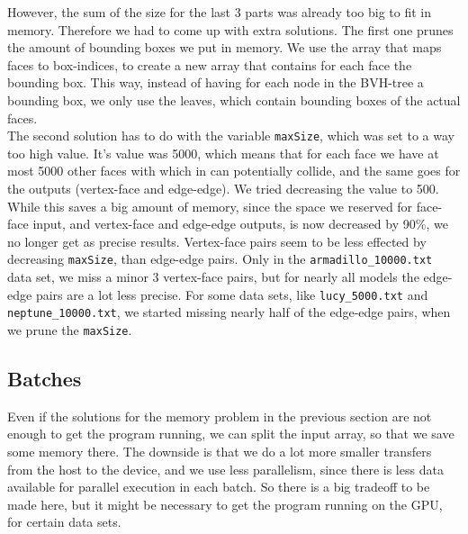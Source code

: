 However, the sum of the size for the last 3 parts was already too big to fit in memory. Therefore we had to come up with extra solutions. The first one prunes the amount of bounding boxes we put in memory. We use the array that maps faces to box-indices, to create a new array that contains for each face the bounding box. This way, instead of having for each node in the BVH-tree a bounding box, we only use the leaves, which contain bounding boxes of the actual faces.\\

The second solution has to do with the variable \texttt{maxSize}, which was set to a way too high value. It's value was 5000, which means that for each face we have at most 5000 other faces with which in can potentially collide, and the same goes for the outputs (vertex-face and edge-edge). We tried decreasing the value to 500. While this saves a big amount of memory, since the space we reserved for face-face input, and vertex-face and edge-edge outputs, is now decreased by 90\%, we no longer get as precise results. Vertex-face pairs seem to be less effected by decreasing \texttt{maxSize}, than edge-edge pairs. Only in the \texttt{armadillo\_10000.txt} data set, we miss a minor 3 vertex-face pairs, but for nearly all models the edge-edge pairs are a lot less precise. For some data sets, like \texttt{lucy\_5000.txt} and \texttt{neptune\_10000.txt}, we started missing nearly half of the edge-edge pairs, when we prune the \texttt{maxSize}.

\subsection{Batches}
Even if the solutions for the memory problem in the previous section are not enough to get the program running, we can split the input array, so that we save some memory there. The downside is that we do a lot more smaller transfers from the host to the device, and we use less parallelism, since there is less data available for parallel execution in each batch. So there is a big tradeoff to be made here, but it might be necessary to get the program running on the GPU, for certain data sets.\\

